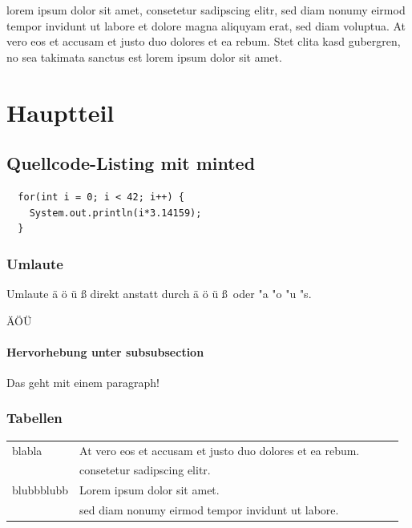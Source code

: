 \documentclass[11pt,a4paper,titlepage,ngerman]{article}
\begin{document}
\gls{lorem} \gls{ipsum} dolor sit amet, consetetur sadipscing elitr, sed diam nonumy eirmod tempor invidunt ut labore et dolore magna aliquyam erat, sed diam voluptua. At vero eos et accusam et justo duo dolores et ea rebum. Stet clita kasd gubergren, no sea takimata sanctus est \gls{lorem} ipsum dolor sit amet. 

\section{Hauptteil}

\subsection{Quellcode-Listing mit minted}

\begin{listing}
\begin{verbatim}
  for(int i = 0; i < 42; i++) {
    System.out.println(i*3.14159);
  }
\end{verbatim}
\end{listing}

\subsubsection{Umlaute}

Umlaute ä ö ü ß direkt anstatt durch \"a \"o \"u \ss\ oder "a "o "u "s.

ÄÖÜ

\paragraph{Hervorhebung unter subsubsection}

Das geht mit einem paragraph!

\subsubsection{Tabellen}

\begin{table}[h]
\begin{tabular}{lllll}
blabla &  At vero eos et accusam et justo duo dolores et ea rebum.\\
       & consetetur sadipscing elitr. \\
blubbblubb &  Lorem ipsum dolor sit amet.\\
       & sed diam nonumy eirmod tempor invidunt ut labore. \\	   
\end{tabular}
\end{table}	
\end{document}
